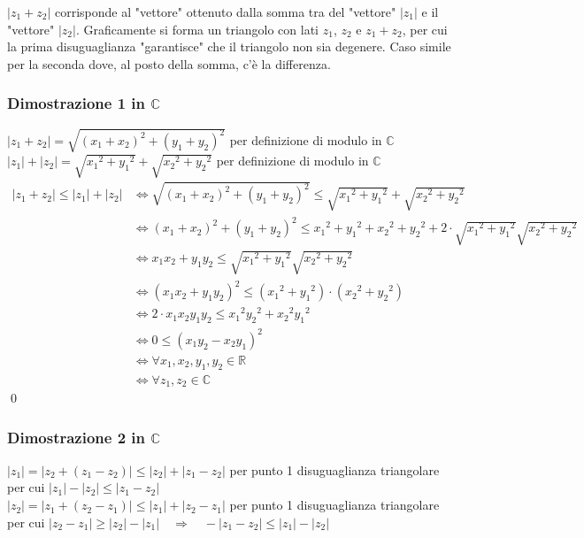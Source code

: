 \documentclass[a4paper]{article}
\begin{document}
\(\left| z_1 + z_2 \right|\) corrisponde al "vettore" ottenuto dalla somma tra del "vettore" \(\left| z_1 \right|\) e il "vettore" \(\left| z_2 \right|\).
Graficamente si forma un triangolo con lati \(z_1\), \(z_2\) e \(z_1 + z_2\), per cui la prima disuguaglianza "garantisce" che il triangolo non sia degenere.
Caso simile per la seconda dove, al posto della somma, c'è la differenza.

\subsubsection*{Dimostrazione 1 in \(\mathbb{C}\)}
\(\left|z_1 + z_2\right| = \sqrt{(x_1 + x_2)^2 + (y_1 + y_2)^2}\) per definizione di modulo in \(\mathbb{C}\) \\
\(\left|z_1\right| + \left|z_2\right| = \sqrt{{x_1}^2 + {y_1}^2} + \sqrt{{x_2}^2 + {y_2}^2}\) per definizione di modulo in \(\mathbb{C}\)
\begin{align*}
	\left|z_1 + z_2\right| \leq \left|z_1\right| + \left|z_2\right| &\Leftrightarrow \sqrt{(x_1 + x_2)^2 + (y_1 + y_2)^2} \leq \sqrt{{x_1}^2 + {y_1}^2} + \sqrt{{x_2}^2 + {y_2}^2} \\
	&\Leftrightarrow (x_1 + x_2)^2 + (y_1 + y_2)^2 \leq {x_1}^2 + {y_1}^2 + {x_2}^2 + {y_2}^2 + 2 \cdot \sqrt{{x_1}^2 + {y_1}^2} \sqrt{{x_2}^2 + {y_2}^2} \\
	&\Leftrightarrow x_1 x_2 + y_1 y_2 \leq \sqrt{{x_1}^2 + {y_1}^2} \sqrt{{x_2}^2 + {y_2}^2} \\
	&\Leftrightarrow \left(x_1 x_2 + y_1 y_2\right)^2 \leq \left({x_1}^2 + {y_1}^2\right) \cdot \left({x_2}^2 + {y_2}^2\right) \\
	&\Leftrightarrow 2 \cdot x_1 x_2 y_1 y_2 \leq {x_1}^2 {y_2}^2 + {x_2}^2 {y_1}^2 \\
	&\Leftrightarrow 0 \leq \left(x_1 y_2 - x_2 y_1\right)^2 \\
	&\Leftrightarrow \forall x_1, x_2, y_1, y_2 \in \mathbb{R} \\
	&\Leftrightarrow \forall z_1, z_2 \in \mathbb{C}
\end{align*}
\qed

\subsubsection*{Dimostrazione 2 in \(\mathbb{C}\)}
\(\left|z_1\right| = \left|z_2 + (z_1 - z_2)\right| \leq \left|z_2\right| + \left|z_1 - z_2\right|\) per punto 1 disuguaglianza triangolare \\
per cui \(\left|z_1\right| - \left|z_2\right| \leq \left|z_1 - z_2\right|\) \\
\(\left|z_2\right| = \left|z_1 + (z_2 - z_1)\right| \leq \left|z_1\right| + \left|z_2 - z_1\right|\) per punto 1 disuguaglianza triangolare \\
per cui \(\left|z_2 - z_1\right| \geq \left|z_2\right| - \left|z_1\right| \quad \Rightarrow \quad -\left|z_1 - z_2\right| \leq \left|z_1\right| - \left|z_2\right|\)
\end{document}
